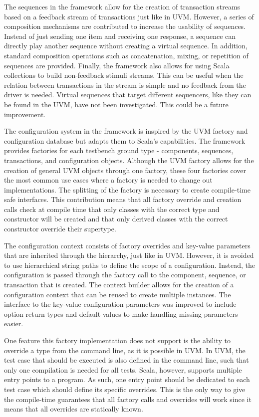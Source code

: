 The sequences in the framework allow for the creation of transaction streams based on a feedback stream of transactions just like in UVM. However, a series of composition mechanisms are contributed to increase the usability of sequences. Instead of just sending one item and receiving one response, a sequence can directly play another sequence without creating a virtual sequence. In addition, standard composition operations such as concatenation, mixing, or repetition of sequences are provided. Finally, the framework also allows for using Scala collections to build non-feedback stimuli streams. This can be useful when the relation between transactions in the stream is simple and no feedback from the driver is needed. Virtual sequences that target different sequencers, like they can be found in the UVM, have not been investigated. This could be a future improvement.

The configuration system in the framework is inspired by the UVM factory and configuration database but adapts them to Scala's capabilities. The framework provides factories for each testbench ground type - components, sequences, transactions, and configuration objects. Although the UVM factory allows for the creation of general UVM objects through one factory, these four factories cover the most common use cases where a factory is needed to change out implementations. The splitting of the factory is necessary to create compile-time safe interfaces. This contribution means that all factory override and creation calls check at compile time that only classes with the correct type and constructor will be created and that only derived classes with the correct constructor override their supertype. 

The configuration context consists of factory overrides and key-value parameters that are inherited through the hierarchy, just like in UVM. However, it is avoided to use hierarchical string paths to define the scope of a configuration. Instead, the configuration is passed through the factory call to the component, sequence, or transaction that is created. The context builder allows for the creation of a configuration context that can be reused to create multiple instances. The interface to the key-value configuration parameters was improved to include option return types and default values to make handling missing parameters easier. 

One feature this factory implementation does not support is the ability to override a type from the command line, as it is possible in UVM. In UVM, the test case that should be executed is also defined in the command line, such that only one compilation is needed for all tests. Scala, however, supports multiple entry points to a program. As such, one entry point should be dedicated to each test case which should define its specific overrides. This is the only way to give the compile-time guarantees that all factory calls and overrides will work since it means that all overrides are statically known.


